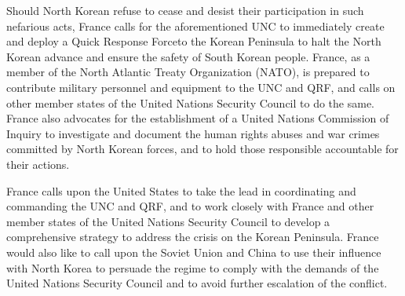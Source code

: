 \documentclass[a4paper,12pt]{article}
\begin{document}
Should North Korean refuse to cease and desist their participation in such nefarious acts, France calls for the aforementioned UNC to immediately create and deploy a Quick Response Force\footnotemark[1] to the Korean Peninsula to halt the North Korean advance and ensure the safety of South Korean people. France, as a member of the North Atlantic Treaty Organization (NATO), is prepared to contribute military personnel and equipment to the UNC and QRF, and calls on other member states of the United Nations Security Council to do the same. France also advocates for the establishment of a United Nations Commission of Inquiry to investigate and document the human rights abuses and war crimes committed by North Korean forces, and to hold those responsible accountable for their actions.

France calls upon the United States to take the lead in coordinating and commanding the UNC and QRF, and to work closely with France and other member states of the United Nations Security Council to develop a comprehensive strategy to address the crisis on the Korean Peninsula. France would also like to call upon the Soviet Union and China to use their influence with North Korea to persuade the regime to comply with the demands of the United Nations Security Council and to avoid further escalation of the conflict.
\end{document}
